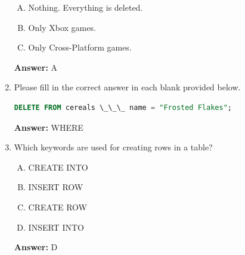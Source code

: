 \documentclass[12pt]{article}
\begin{document}
\begin{enumerate}[1.]
    \bigskip

    \begin{enumerate}[A.]
        \item Nothing. Everything is deleted.
        \item Only Xbox games.
        \item Only Cross-Platform games.
    \end{enumerate}

    \bigskip

    \textbf{Answer:} A

    \item

    Please fill in the correct answer in each blank provided below.

    \bigskip

    \begin{lstlisting}[language=SQL]
    DELETE FROM cereals \_\_\_ name = "Frosted Flakes";
    \end{lstlisting}

    \bigskip

    \textbf{Answer:} WHERE

    \item

    Which keywords are used for creating rows in a table?

    \bigskip

    \begin{enumerate}[A.]
        \item CREATE INTO
        \item INSERT ROW
        \item CREATE ROW
        \item INSERT INTO
    \end{enumerate}

    \bigskip

    \textbf{Answer:} D

\end{enumerate}
\end{document}
